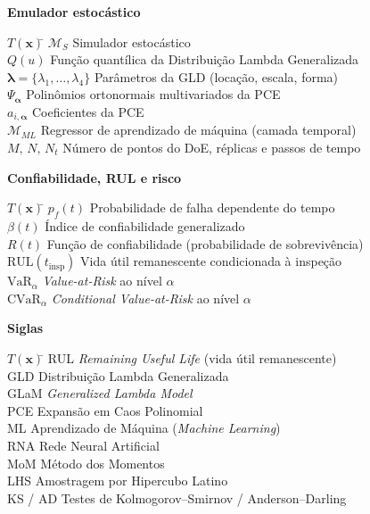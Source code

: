 \noindent\textbf{Emulador estoc\'astico}
\begin{tabbing}
$T(\mathbf{x})$\qquad\qquad \= \kill
$\mathcal{M}_S$ \> Simulador estoc\'astico \\
$Q(u)$        \> Fun\c{c}\~ao quant\'ilica da Distribui\c{c}\~ao Lambda Generalizada \\
$\boldsymbol{\lambda}=\{\lambda_1,\dots,\lambda_4\}$ \> Par\^ametros da GLD (loca\c{c}\~ao, escala, forma) \\
$\Psi_{\boldsymbol{\alpha}}$ \> Polin\^omios ortonormais multivariados da PCE \\
$a_{i,\boldsymbol{\alpha}}$ \> Coeficientes da PCE \\
$\mathcal{M}_{ML}$ \> Regressor de aprendizado de m\'aquina (camada temporal) \\
$M,\,N,\,N_t$ \> N\'umero de pontos do DoE, r\'eplicas e passos de tempo
\end{tabbing}

\noindent\textbf{Confiabilidade, RUL e risco}
\begin{tabbing}
$T(\mathbf{x})$\qquad\qquad \= \kill
$p_f(t)$      \> Probabilidade de falha dependente do tempo \\
$\beta(t)$    \> \'Indice de confiabilidade generalizado \\
$R(t)$        \> Fun\c{c}\~ao de confiabilidade (probabilidade de sobreviv\^encia) \\
$\mathrm{RUL}(t_{\mathrm{insp}})$ \> Vida \'util remanescente condicionada \`a inspe\c{c}\~ao \\
$\mathrm{VaR}_\alpha$ \> \textit{Value-at-Risk} ao n\'ivel $\alpha$ \\
$\mathrm{CVaR}_\alpha$ \> \textit{Conditional Value-at-Risk} ao n\'ivel $\alpha$
\end{tabbing}

\noindent\textbf{Siglas}
\begin{tabbing}
$T(\mathbf{x})$\qquad\qquad \= \kill
RUL \> \textit{Remaining Useful Life} (vida \'util remanescente) \\
GLD \> Distribui\c{c}\~ao Lambda Generalizada \\
GLaM \> \textit{Generalized Lambda Model} \\
PCE \> Expans\~ao em Caos Polinomial \\
ML \> Aprendizado de M\'aquina (\textit{Machine Learning}) \\
RNA \> Rede Neural Artificial \\
MoM \> M\'etodo dos Momentos \\
LHS \> Amostragem por Hipercubo Latino \\
KS / AD \> Testes de Kolmogorov--Smirnov / Anderson--Darling
\end{tabbing}
